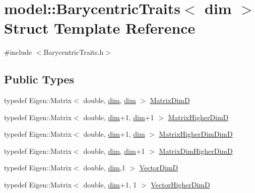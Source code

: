 \hypertarget{structmodel_1_1_barycentric_traits}{}\section{model\+:\+:Barycentric\+Traits$<$ dim $>$ Struct Template Reference}
\label{structmodel_1_1_barycentric_traits}


{\ttfamily \#include $<$Barycentric\+Traits.\+h$>$}

\subsection*{Public Types}
\begin{DoxyCompactItemize}
\item 
typedef Eigen\+::\+Matrix$<$ double, \hyperlink{plot_nd_a_8m_a382f3ca768b275b8d563604f7fc7df73}{dim}, \hyperlink{plot_nd_a_8m_a382f3ca768b275b8d563604f7fc7df73}{dim} $>$ \hyperlink{structmodel_1_1_barycentric_traits_a40fdf63235669f5a7697b19130782975}{Matrix\+Dim\+D}
\item 
typedef Eigen\+::\+Matrix$<$ double, \hyperlink{plot_nd_a_8m_a382f3ca768b275b8d563604f7fc7df73}{dim}+1, \hyperlink{plot_nd_a_8m_a382f3ca768b275b8d563604f7fc7df73}{dim}+1 $>$ \hyperlink{structmodel_1_1_barycentric_traits_a90e0d5eb84d856af28e250bbb11f2ced}{Matrix\+Higher\+Dim\+D}
\item 
typedef Eigen\+::\+Matrix$<$ double, \hyperlink{plot_nd_a_8m_a382f3ca768b275b8d563604f7fc7df73}{dim}+1, \hyperlink{plot_nd_a_8m_a382f3ca768b275b8d563604f7fc7df73}{dim} $>$ \hyperlink{structmodel_1_1_barycentric_traits_afe45a5057be0ecbe991df26efe84ce2e}{Matrix\+Higher\+Dim\+Dim\+D}
\item 
typedef Eigen\+::\+Matrix$<$ double, \hyperlink{plot_nd_a_8m_a382f3ca768b275b8d563604f7fc7df73}{dim}, \hyperlink{plot_nd_a_8m_a382f3ca768b275b8d563604f7fc7df73}{dim}+1 $>$ \hyperlink{structmodel_1_1_barycentric_traits_a2c6fbdc726cddd2ee8e5e10695aeeb58}{Matrix\+Dim\+Higher\+Dim\+D}
\item 
typedef Eigen\+::\+Matrix$<$ double, \hyperlink{plot_nd_a_8m_a382f3ca768b275b8d563604f7fc7df73}{dim},1 $>$ \hyperlink{structmodel_1_1_barycentric_traits_a05149349d869b7dfa9c40be51dce1472}{Vector\+Dim\+D}
\item 
typedef Eigen\+::\+Matrix$<$ double, \hyperlink{plot_nd_a_8m_a382f3ca768b275b8d563604f7fc7df73}{dim}+1, 1 $>$ \hyperlink{structmodel_1_1_barycentric_traits_acf017f73aa445c84be0b91d5cdf3d5de}{Vector\+Higher\+Dim\+D}
\end{DoxyCompactItemize}
